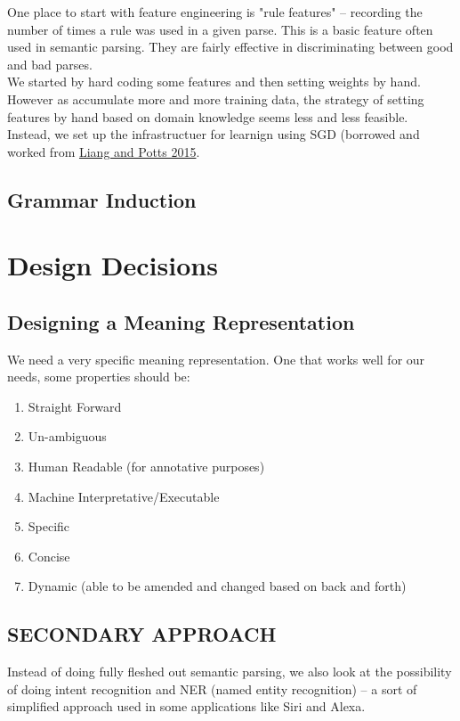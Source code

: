 \documentclass[pageno]{jpaper}
\begin{document}
One place to start with feature engineering is "rule features" -- recording the number of times a rule was used in a given parse. This is a basic feature often used in semantic parsing.  They are fairly effective in discriminating between good and bad parses. \\

We started by hard coding some features and then setting weights by hand. However as accumulate more and more training data, the strategy of setting features by hand based on domain knowledge seems less and less feasible. \\

Instead, we set up the infrastructuer for learnign using SGD (borrowed and worked from \href{https://www.annualreviews.org/doi/pdf/10.1146/annurev-linguist-030514-125312}{Liang and Potts 2015}. 


\subsection{Grammar Induction}


\section{Design Decisions}

\subsection{Designing a Meaning Representation}
We need a very specific meaning representation. One that works well for our needs, some properties should be:
\begin{enumerate}
\item Straight Forward
\item Un-ambiguous
\item Human Readable (for annotative purposes)
\item Machine Interpretative/Executable
\item Specific
\item Concise
\item Dynamic (able to be amended and changed based on back and forth)
\end{enumerate}

\subsection{SECONDARY APPROACH}
Instead of doing fully fleshed out semantic parsing, we also look at the possibility of doing intent recognition and NER (named entity recognition) -- a sort of simplified approach used in some applications like Siri and Alexa. 
\end{document}
